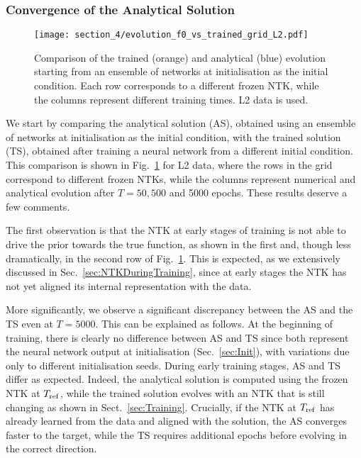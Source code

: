 \subsubsection{Convergence of the Analytical Solution}
\begin{figure}[t]
  \centering
  \texttt{[image: section\_4/evolution\_f0\_vs\_trained\_grid\_L2.pdf]} 
  \caption{Comparison of the trained (orange) and analytical (blue) evolution
  starting from an ensemble of networks at initialisation as the initial
  condition. Each row corresponds to a different frozen NTK, while the columns
  represent different training times. L2 data is used.}
  \label{fig:EvolutionGridF0L2}
\end{figure}
We start by comparing the analytical solution (AS), obtained using an ensemble
of networks at initialisation as the initial condition, with the trained
solution (TS), obtained after training a neural network from a different initial
condition. This comparison is shown in Fig.~\ref{fig:EvolutionGridF0L2} for L2
data, where the rows in the grid correspond to different frozen NTKs, while the
columns represent numerical and analytical evolution after $T=50, 500$ and 5000
epochs. These results deserve a few comments.

The first observation is that the NTK at early stages of training is not able to
drive the prior towards the true function, as shown in the first and, though
less dramatically, in the second row of Fig.~\ref{fig:EvolutionGridF0L2}. This
is expected, as we extensively discussed in Sec.~\ref{sec:NTKDuringTraining},
since at early stages the NTK has not yet aligned its internal representation
with the data.

More significantly, we observe a significant discrepancy between the AS and the
TS even at $T=5000$. This can be explained as follows. At the beginning of
training, there is clearly no difference between AS and TS since both represent
the neural network output at initialisation (Sec.~\ref{sec:Init}), with
variations due only to different initialisation seeds. During early training
stages, AS and TS differ as expected. Indeed, the analytical solution is
computed using the frozen NTK at $T_{\rm ref}$, while the trained solution
evolves with an NTK that is still changing as shown in Sect.~\ref{sec:Training}.
Crucially, if the NTK at $T_{\rm ref}$ has already learned from the data and
aligned with the solution, the AS converges faster to the target, while the TS
requires additional epochs before evolving in the correct direction.

